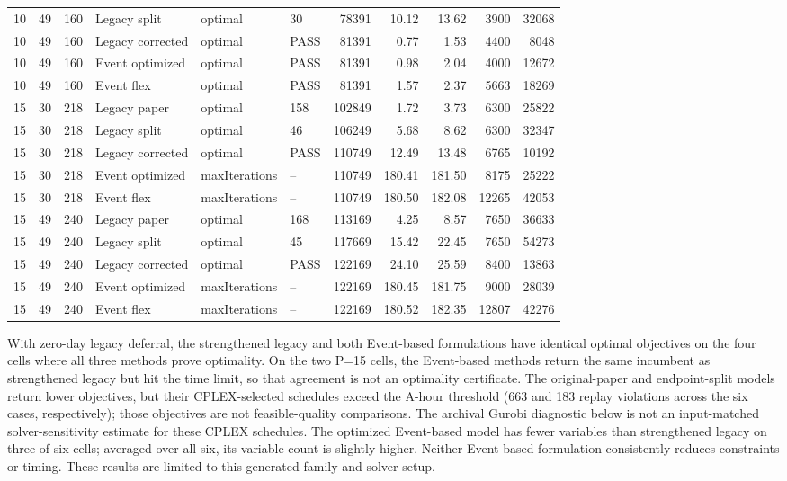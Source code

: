 \begin{table}[p]
{\begin{tabular}{rrrlllr rrrr}
10 & 49 & 160 & Legacy split & optimal & 30 & 78391 & 10.12 & 13.62 & 3900 & 32068 \\
10 & 49 & 160 & Legacy corrected & optimal & PASS & 81391 & 0.77 & 1.53 & 4400 & 8048 \\
10 & 49 & 160 & Event optimized & optimal & PASS & 81391 & 0.98 & 2.04 & 4000 & 12672 \\
10 & 49 & 160 & Event flex & optimal & PASS & 81391 & 1.57 & 2.37 & 5663 & 18269 \\
15 & 30 & 218 & Legacy paper & optimal & 158 & 102849 & 1.72 & 3.73 & 6300 & 25822 \\
15 & 30 & 218 & Legacy split & optimal & 46 & 106249 & 5.68 & 8.62 & 6300 & 32347 \\
15 & 30 & 218 & Legacy corrected & optimal & PASS & 110749 & 12.49 & 13.48 & 6765 & 10192 \\
15 & 30 & 218 & Event optimized & maxIterations & -- & 110749 & 180.41 & 181.50 & 8175 & 25222 \\
15 & 30 & 218 & Event flex & maxIterations & -- & 110749 & 180.50 & 182.08 & 12265 & 42053 \\
15 & 49 & 240 & Legacy paper & optimal & 168 & 113169 & 4.25 & 8.57 & 7650 & 36633 \\
15 & 49 & 240 & Legacy split & optimal & 45 & 117669 & 15.42 & 22.45 & 7650 & 54273 \\
15 & 49 & 240 & Legacy corrected & optimal & PASS & 122169 & 24.10 & 25.59 & 8400 & 13863 \\
15 & 49 & 240 & Event optimized & maxIterations & -- & 122169 & 180.45 & 181.75 & 9000 & 28039 \\
15 & 49 & 240 & Event flex & maxIterations & -- & 122169 & 180.52 & 182.35 & 12807 & 42276 \\
\bottomrule
\end{tabular}
}%
\end{table}

With zero-day legacy deferral, the strengthened legacy and both Event-based
formulations have identical optimal objectives on the four cells where all
three methods prove optimality. On the two P=15 cells, the Event-based methods
return the same incumbent as strengthened legacy but hit the time limit, so
that agreement is not an optimality certificate. The original-paper and
endpoint-split models return lower objectives, but their CPLEX-selected
schedules exceed the A-hour threshold (663 and 183 replay violations across
the six cases, respectively); those objectives are not feasible-quality
comparisons. The archival Gurobi diagnostic below is not an input-matched
solver-sensitivity estimate for these CPLEX schedules.
The optimized Event-based model has fewer variables than strengthened legacy
on three of six cells; averaged over all six, its variable count is slightly
higher. Neither Event-based formulation consistently reduces constraints or
timing. These results are limited to this generated family and solver setup.

